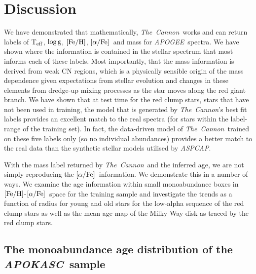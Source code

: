 \documentclass[12pt, preprint]{aastex}
\newcommand{\project}[1]{\textsl{#1}}
\newcommand{\thecannon}{\project{The~Cannon}}
\newcommand{\tc}{\project{The~Cannon}}
\newcommand{\apogee}{\project{APOGEE}}
\newcommand{\apokasc}{\project{APOKASC}}
\newcommand{\aspcap}{\project{ASPCAP}}
\newcommand{\teff}{\mbox{$\rm T_{eff}$}}
\newcommand{\feh}{\mbox{$\rm [Fe/H]$}}
\newcommand{\alphafe}{\mbox{$\rm [\alpha/Fe]$}}
\newcommand{\logg}{\mbox{$\rm \log g$}}
\begin{document}
\section{Discussion}


We have demonstrated that mathematically, \tc\ works and can return labels of \teff, \logg, \feh, \alphafe\ and mass for \apogee\ spectra. We have shown where the information is contained in the stellar spectrum that most informs each of these labels. Most importantly, that the mass information is derived from weak CN regions, which is a physically sensible origin of the mass dependence given expectations from stellar evolution and changes in these elements from dredge-up mixing processes as the star moves along the red giant branch. We have shown that at test time for the red clump stars, stars that have not been used in training, the model that is generated by \tc's best fit labels provides an excellent match to the real spectra (for stars within the label-range of the training set). In fact, the data-driven model of \tc\ trained on these five labels only (so no individual abundances) provides a better match to the real data than the synthetic stellar models utilised by \aspcap.

With the mass label returned by \tc\ and the inferred age, we are not simply reproducing the \alphafe\ information. We demonstrate this in a number of ways. We examine the age information within small monoabundance boxes in \feh-\alphafe\ space for the training sample and investigate the trends as a function of radius for young and old stars for the low-alpha sequence of the red clump stars as well as the mean age map of the Milky Way disk as traced by the red clump stars.


\subsection{The monoabundance age distribution of the \apokasc\ sample}
\end{document}
